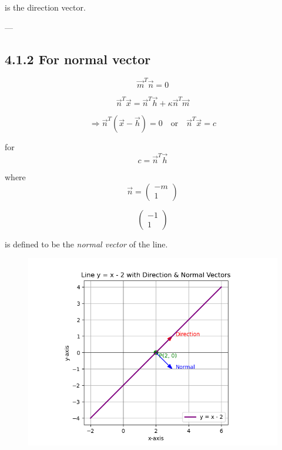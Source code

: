 \documentclass[journal]{IEEEtran}
\begin{document}
is the direction vector.  

---

\subsection*{4.1.2 For normal vector}

\begin{equation}
\vec{m}^T \vec{n} = 0
\tag{4.2.18.5}
\end{equation}

\[
\vec{n}^T \vec{x} = \vec{n}^T \vec{h} + \kappa \vec{n}^T \vec{m}
\tag{4.2.18.6}
\]

\[
\Rightarrow \vec{n}^T (\vec{x} - \vec{h}) = 0
\quad \text{or} \quad
\vec{n}^T \vec{x} = c
\tag{4.2.18.7}
\]

for
\begin{equation}
c = \vec{n}^T \vec{h}
\tag{4.2.18.8}
\end{equation}

where
\[
\vec{n} =
\begin{pmatrix}
-m \\ 1
\end{pmatrix}
\tag{4.2.18.9}
\]

\[
\begin{pmatrix}
-1 \\ 1
\end{pmatrix}
\]




is defined to be the \textit{normal vector} of the line.

\begin{figure}[H]
\begin{center}
\includegraphics[width=0.6\columnwidth]{Figs/Fig1.png}
\end{center}
\caption{}
\label{fig:Fig.1}
\end{figure}
\end{document}
